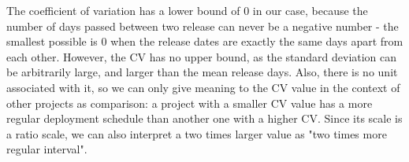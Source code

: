 \begin{table}
    \centering
    \caption{Release regularities for major, minor and patch releases.}
    \label{tab:regularity}
\end{table}

The coefficient of variation has a lower bound of $0$ in our case, because the number of days passed between two release can never be a negative number - the smallest possible is $0$ when the release dates are exactly the same days apart from each other. However, the CV has no upper bound, as the standard deviation can be arbitrarily large, and larger than the mean release days. Also, there is no unit associated with it, so we can only give meaning to the CV value in the context of other projects as comparison: a project with a smaller CV value has a more regular deployment schedule than another one with a higher CV. Since its scale is a ratio scale, we can also interpret a two times larger value as "two times more regular interval".


